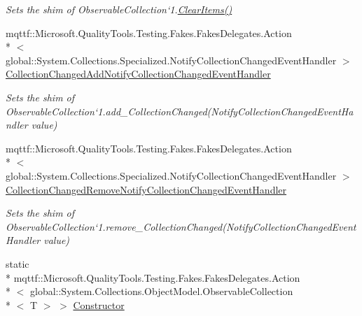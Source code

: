 \begin{DoxyCompactItemize}
\begin{DoxyCompactList}\small\item\em Sets the shim of Observable\-Collection`1.\hyperlink{class_system_1_1_collections_1_1_object_model_1_1_fakes_1_1_shim_observable_collection_3_01_t_01_4_a84f08ed60776f5ac62c86d96b7287ba4}{Clear\-Items()}\end{DoxyCompactList}\item 
mqttf\-::\-Microsoft.\-Quality\-Tools.\-Testing.\-Fakes.\-Fakes\-Delegates.\-Action\\*
$<$ global\-::\-System.\-Collections.\-Specialized.\-Notify\-Collection\-Changed\-Event\-Handler $>$ \hyperlink{class_system_1_1_collections_1_1_object_model_1_1_fakes_1_1_shim_observable_collection_3_01_t_01_4_ac6ac32cc92cbe483da5ceebe58baa862}{Collection\-Changed\-Add\-Notify\-Collection\-Changed\-Event\-Handler}
\begin{DoxyCompactList}\small\item\em Sets the shim of Observable\-Collection`1.add\-\_\-\-Collection\-Changed(\-Notify\-Collection\-Changed\-Event\-Handler value)\end{DoxyCompactList}\item 
mqttf\-::\-Microsoft.\-Quality\-Tools.\-Testing.\-Fakes.\-Fakes\-Delegates.\-Action\\*
$<$ global\-::\-System.\-Collections.\-Specialized.\-Notify\-Collection\-Changed\-Event\-Handler $>$ \hyperlink{class_system_1_1_collections_1_1_object_model_1_1_fakes_1_1_shim_observable_collection_3_01_t_01_4_a4dbe18918084a7bf9c10c81f3ac77273}{Collection\-Changed\-Remove\-Notify\-Collection\-Changed\-Event\-Handler}
\begin{DoxyCompactList}\small\item\em Sets the shim of Observable\-Collection`1.remove\-\_\-\-Collection\-Changed(\-Notify\-Collection\-Changed\-Event\-Handler value)\end{DoxyCompactList}\item 
static \\*
mqttf\-::\-Microsoft.\-Quality\-Tools.\-Testing.\-Fakes.\-Fakes\-Delegates.\-Action\\*
$<$ global\-::\-System.\-Collections.\-Object\-Model.\-Observable\-Collection\\*
$<$ T $>$ $>$ \hyperlink{class_system_1_1_collections_1_1_object_model_1_1_fakes_1_1_shim_observable_collection_3_01_t_01_4_ad9d28ab360594cef0b9ce0d4d2653d72}{Constructor}

\end{DoxyCompactItemize}
